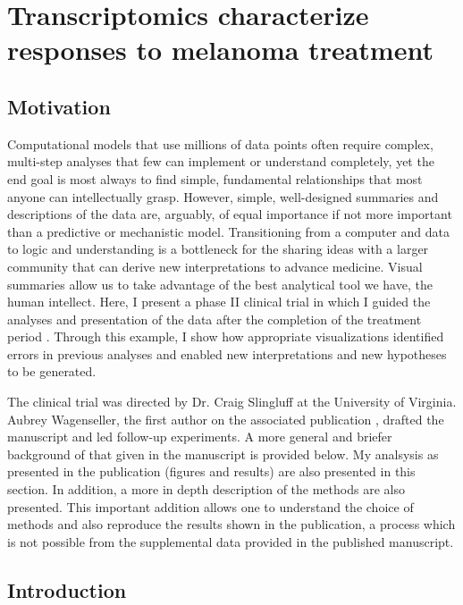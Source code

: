 
\chapter[miRNA Transcriptomics of melanoma]{ Transcriptomics characterize responses to melanoma treatment }

\section{Motivation}

Computational models that use millions of data points
often require complex, multi-step analyses that few can implement or understand completely, 
yet the end goal is most always 
to find simple, fundamental relationships
that most anyone can intellectually grasp. However, simple, well-designed
summaries and descriptions of the data are, arguably, of equal importance if not
more important than a predictive or mechanistic model.
Transitioning from a computer and data to logic and understanding is a
bottleneck for the sharing ideas with a larger community
that can derive new interpretations to advance medicine.
Visual summaries allow us to take advantage of the best
analytical tool we have, the human intellect.
Here, I present a phase II
clinical trial in which I guided the analyses and presentation of the data
after the completion of the treatment period \cite{Wagenseller:2013fj}.
Through this example, I show how appropriate visualizations identified
errors in previous analyses and enabled new interpretations and new
hypotheses to be generated.

The clinical trial was directed by Dr. Craig Slingluff at the
University of Virginia. Aubrey Wagenseller, the first author on the associated
publication \cite{Wagenseller:2013fj}, drafted the manuscript 
and led follow-up experiments. A more general and briefer background
of that given in the manuscript is provided below. My analsysis as presented
in the publication (figures and results) are also presented in this section. 
In addition, a more in depth description of the
methods are also presented. This important addition allows one to understand
the choice of methods and also reproduce
the results shown in the publication, a process which is not possible from the
supplemental data provided in the published manuscript.

\section{Introduction}

